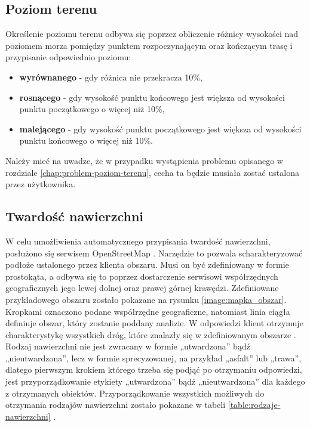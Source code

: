 \subsection{Poziom terenu}
Określenie poziomu terenu odbywa się poprzez obliczenie różnicy wysokości nad poziomem morza pomiędzy punktem rozpoczynającym oraz kończącym trasę i przypisanie odpowiednio poziomu:
\begin{itemize}
\item{\textbf{wyrównanego}} - gdy różnica nie przekracza 10\%,
\item{\textbf{rosnącego}} - gdy wysokość punktu końcowego jest większa od wysokości punktu początkowego o więcej niż 10\%,
\item{\textbf{malejącego}} - gdy wysokość punktu początkowego jest większa od wysokości punktu końcowego o więcej niż 10\%.
\end {itemize}
Należy mieć na uwadze, że w przypadku wystąpienia problemu opisanego w rozdziale \ref{chap:problem-poziom-terenu}, cecha ta będzie musiała zostać ustalona przez użytkownika.

\subsection{Twardość nawierzchni}\label{chapter:wyznaczenie-twardosc}
W celu umożliwienia automatycznego przypisania twardość nawierzchni, posłużono się serwisem OpenStreetMap \cite{osm}. Narzędzie to pozwala scharakteryzować podłoże ustalonego przez klienta obszaru. Musi on być zdefiniowany w formie prostokąta, a odbywa się to poprzez dostarczenie serwisowi współrzędnych geograficznych jego lewej dolnej oraz prawej górnej krawędzi. Zdefiniowane przykładowego obszaru zostało pokazane na rysunku \ref{image:mapka_obszar}. Kropkami oznaczono podane współrzędne geograficzne, natomiast linia ciągła definiuje obszar, który zostanie poddany analizie. W odpowiedzi klient otrzymuje charakterystykę wszystkich dróg, które znalazły się w zdefiniowanym obszarze \cite{osm-docs-wiki}. Rodzaj nawierzchni nie jest zwracany w formie „utwardzona” bądź „nieutwardzona”, lecz w formie sprecyzowanej, na przykład „asfalt” lub „trawa”, dlatego pierwszym krokiem którego trzeba się podjąć po otrzymaniu odpowiedzi, jest przyporządkowanie etykiety  „utwardzona” bądź „nieutwardzona” dla każdego z otrzymanych obiektów. Przyporządkowanie wszystkich możliwych do otrzymania rodzajów nawierzchni zostało pokazane w tabeli \ref{table:rodzaje-nawierzchni} \cite{osm-surface}.

